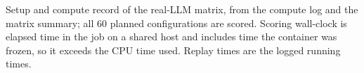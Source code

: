 Setup and compute record of the real-LLM matrix, from the compute log and the matrix summary; all 60 planned configurations are scored. Scoring wall-clock is elapsed time in the job on a shared host and includes time the container was frozen, so it exceeds the CPU time used. Replay times are the logged running times.

